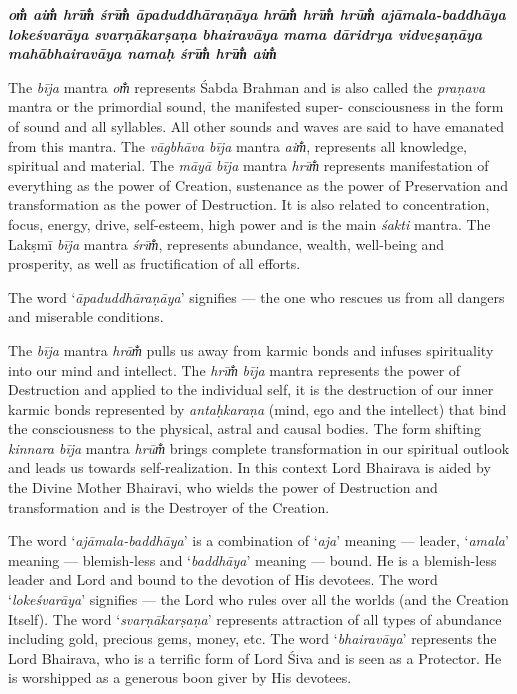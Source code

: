\documentclass[12pt,oneside,a4paper]{article}
\newenvironment{shloka}[1]
  {\bigskip\center#1\varwidth{\linewidth}}
  {\endvarwidth\endcenter\bigskip}
\newcommand{\tl}[1]{\emph{#1}}
\begin{document}
\begin{shloka}\itshape\bfseries
  om̐ aim̐ hrīm̐ śrīm̐ āpaduddhāraṇāya hrām̐ hrīm̐ hrūm̐ ajāmala-baddhāya lokeśvarāya
  svarṇākarṣaṇa bhairavāya mama dāridrya vidveṣaṇāya mahābhairavāya namaḥ
  śrīm̐ hrīm̐ aim̐
\end{shloka}

The \tl{bīja} mantra \tl{om̐} represents Śabda Brahman and is also called
the \tl{praṇava} mantra or the primordial sound, the manifested super-
consciousness in the form of sound and all syllables. All other sounds and waves
are said to have emanated from this mantra. The \tl{vāgbhāva bīja} mantra
\tl{aim̐}, represents all knowledge, spiritual and material. The \tl{māyā bīja}
mantra \tl{hrīm̐} represents manifestation of everything as the power of Creation,
sustenance as the power of Preservation and transformation as the power of
Destruction. It is also related to concentration, focus, energy, drive,
self-esteem, high power and is the main \tl{śakti} mantra. The Lakṣmī \tl{bīja}
mantra \tl{śrīm̐}, represents abundance, wealth, well-being and prosperity,
as well as fructification of all efforts.

The word ‘\tl{āpaduddhāraṇāya}’ signifies — the one who rescues us from all
dangers and miserable conditions.

The \tl{bīja} mantra \tl{hrām̐} pulls us away from karmic bonds and infuses
spirituality into our mind and intellect. The \tl{hrīm̐} \tl{bīja} mantra
represents the power of Destruction and applied to the individual self, it is
the destruction of our inner karmic bonds represented by \tl{antaḥkaraṇa} (mind,
ego and the intellect) that bind the consciousness to the physical, astral and
causal bodies. The form shifting \tl{kinnara bīja} mantra \tl{hrūm̐} brings
complete transformation in our spiritual outlook and leads us towards
self-realization. In this context Lord Bhairava is aided by the Divine Mother
Bhairavi, who wields the power of Destruction and transformation and is
the Destroyer of the Creation.

The word ‘\tl{ajāmala-baddhāya}’ is a combination of ‘\tl{aja}’ meaning —
leader, ‘\tl{amala}’ meaning — blemish-less and ‘\tl{baddhāya}’ meaning — bound.
He is a blemish-less leader and Lord and bound to the devotion of His devotees.
The word ‘\tl{lokeśvarāya}’ signifies — the Lord who rules over all the worlds
(and the Creation Itself). The word ‘\tl{svarṇākarṣaṇa}’ represents attraction
of all types of abundance including gold, precious gems, money, etc.
The word ‘\tl{bhairavāya}’ represents the Lord Bhairava, who is a terrific form
of Lord Śiva and is seen as a Protector. He is worshipped as a generous boon
giver by His devotees.
\end{document}
